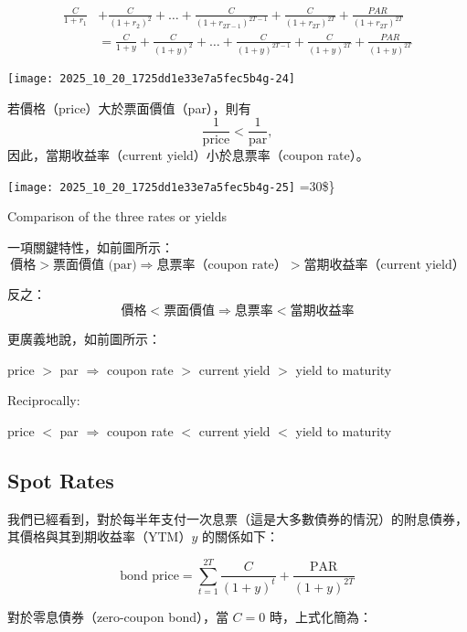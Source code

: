 \documentclass[letterpaper]{article}
\begin{document}
$$
\begin{aligned}
\frac{C}{1+r_{1}} & +\frac{C}{\left(1+r_{2}\right)^{2}}+\ldots+\frac{C}{\left(1+r_{2 T-1}\right)^{2 T-1}}+\frac{C}{\left(1+r_{2 T}\right)^{2 T}}+\frac{P A R}{\left(1+r_{2 T}\right)^{2 T}} \\
& =\frac{C}{1+y}+\frac{C}{(1+y)^{2}}+\ldots+\frac{C}{(1+y)^{2 T-1}}+\frac{C}{(1+y)^{2 T}}+\frac{P A R}{(1+y)^{2 T}}
\end{aligned}
$$

\texttt{[image: 2025\_10\_20\_1725dd1e33e7a5fec5b4g-24]}


若價格（price）大於票面價值（par），則有
\[
\frac{1}{\text{price}} < \frac{1}{\text{par}},
\]
因此，當期收益率（current yield）小於息票率（coupon rate）。


  \texttt{[image: 2025\_10\_20\_1725dd1e33e7a5fec5b4g-25]}
  =30\$\}

Comparison of the three rates or yields

一項關鍵特性，如前圖所示：  
\[
\text{價格} > \text{票面價值 (par)} \Longrightarrow \text{息票率（coupon rate）} > \text{當期收益率（current yield）}
\]

反之：  
\[
\text{價格} < \text{票面價值} \Longrightarrow \text{息票率} < \text{當期收益率}
\]

更廣義地說，如前圖所示：


price $>$ par $\Longrightarrow$ coupon rate $>$ current yield $>$ yield to maturity


Reciprocally:


price $<$ par $\Longrightarrow$ coupon rate $<$ current yield $<$ yield to maturity

\subsection{Spot Rates}
我們已經看到，對於每半年支付一次息票（這是大多數債券的情況）的附息債券，其價格與其到期收益率（YTM）\( y \) 的關係如下：

\[
\text{bond price} = \sum_{t=1}^{2T} \frac{C}{(1 + y)^t} + \frac{\mathrm{PAR}}{(1 + y)^{2T}}
\]

對於零息債券（zero-coupon bond），當 \( C = 0 \) 時，上式化簡為：
\end{document}
